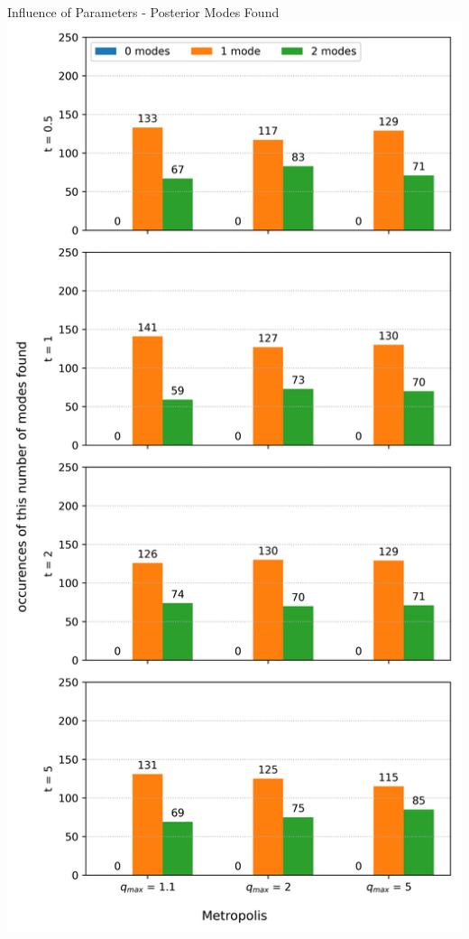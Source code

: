 \documentclass[]{beamer}
\begin{document}
  \begin{frame}{Influence of Parameters - Posterior Modes Found}
    \centering
    \includegraphics[scale=0.25]{figs/results/params/modes_found_metropolis.png}

\end{frame}
\end{document}
